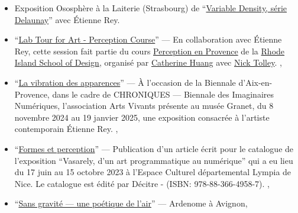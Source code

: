 \documentclass[10pt,french,a4paper,oneside]{article}%
\newcommand{\years}[1]{\marginpar{\textit{\scriptsize #1}}}
\begin{document}
\begin{itemize}
	\item Exposition Ososphère à la Laiterie (Strasbourg) de ``\href{https://laurentperrinet.github.io/post/2026-02-20_ososphere/}{Variable Density, série Delaunay}'' avec Étienne Rey.
	
	\item ``\href{https://laurentperrinet.github.io/talk/2026-01-19-art-and-science}{Lab Tour for Art - Perception Course}'' --- En collaboration avec Étienne Rey, cette session fait partie du cours \href{https://www.risd.edu/academics/illustration/courses}{Perception en Provence} de la \href{https://www.risd.edu}{Rhode Island School of Design}, organisé par \href{https://www.instagram.com/cathuangart/}{Catherine Huang} avec \href{https://www.linkedin.com/in/ntolley/}{Nick Tolley}.	\years{2026},

	\item ``\href{https://laurentperrinet.github.io/post/2024-11-07_vibration-apparences/}{La vibration des apparences}'' --- À l'occasion de la Biennale d'Aix-en-Provence, dans le cadre de CHRONIQUES --- Biennale des Imaginaires Numériques, l'association Arts Vivants présente au musée Granet, du 8 novembre 2024 au 19 janvier 2025, une exposition consacrée à l'artiste contemporain Étienne Rey. \years{2024},
	
	\item ``\href{https://laurentperrinet.github.io/publication/perrinet-23-formes-et-perception/}{Formes et perception}'' --- Publication d'un article écrit pour le catalogue de l'exposition ``Vasarely, d'un art programmatique au numérique'' qui a eu lieu du 17 juin au 15 octobre 2023 à l'Espace Culturel départemental Lympia de Nice. Le catalogue est édité par Décitre - (ISBN: 978-88-366-4958-7). \years{2023},
	
	\item ``\href{https://laurentperrinet.github.io/post/2019-06-22_ardemone/}{Sans gravité --- une poétique de l'air}'' --- Ardenome à Avignon\years{2019},
	

\end{itemize}
\end{document}
